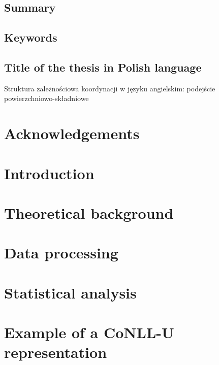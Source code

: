\documentclass[12pt]{report}
\begin{document}


\onehalfspacing

\pagestyle{empty}
\section*{\centering Summary}

\section*{\centering Keywords}

\section*{\centering Title of the thesis in Polish language}
Struktura zależnościowa koordynacji w języku angielskim: podejście powierzchniowo-składniowe

%
%

\tableofcontents

\chapter*{Acknowledgements}
    

\pagestyle{fancy}
\chapter{Introduction}\label{ch:introduction}
    
\chapter{Theoretical background}
    
\chapter{Data processing}
    
\chapter{Statistical analysis}
    

\appendix
\chapter{Example of a CoNLL-U representation}\label{ap:conllu}
    


\end{document}
